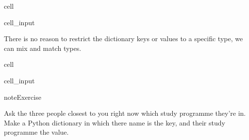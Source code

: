 \documentclass[letterpaper,10pt,english]{jupyterBook}
\begin{document}
\begin{sphinxuseclass}{cell}\begin{sphinxVerbatimInput}

\begin{sphinxuseclass}{cell_input}
\begin{sphinxVerbatim}[commandchars=\\\{\}]
     
\PYG{p}{[}\PYG{p}{]} \PYG{p}{[}\PYG{p}{]}
\end{sphinxVerbatim}

\end{sphinxuseclass}\end{sphinxVerbatimInput}

\end{sphinxuseclass}
\sphinxAtStartPar
There is no reason to restrict the dictionary keys or values to a specific type, we can mix and match types.

\begin{sphinxuseclass}{cell}\begin{sphinxVerbatimInput}

\begin{sphinxuseclass}{cell_input}
\begin{sphinxVerbatim}[commandchars=\\\{\}]
       
\PYG{p}{[}\PYG{p}{]}
\end{sphinxVerbatim}

\end{sphinxuseclass}\end{sphinxVerbatimInput}

\end{sphinxuseclass}
\begin{sphinxadmonition}{note}{Exercise}

\sphinxAtStartPar
Ask the three people closest to you right now which study programme they’re in. Make a Python dictionary in which there name is the key, and their study programme the value.
\end{sphinxadmonition}
\end{document}
